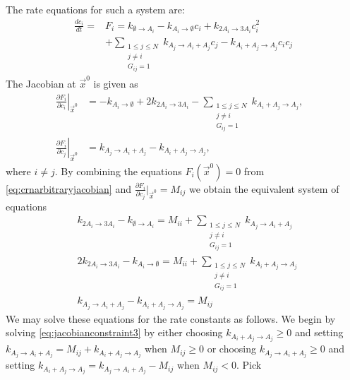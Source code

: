 The rate equations for such a system are:
\begin{equation}\label{eq:crnarbitraryjacobian}
\begin{aligned}
\frac{dc_i}{dt} = &F_i = k_{\emptyset \to A_i} - k_{A_i \to \emptyset} c_i + k_{2A_i \to 3A_i} c_i^2 \\
&+ \sum_{\substack{1 \le j \le N \\ j \neq i \\ G_{ij} = 1}} k_{A_j \to A_i + A_j} c_j - k_{A_i + A_j \to A_j} c_i c_j
\end{aligned}
\end{equation}
The Jacobian at $\vec{x}^0$ is given as
\begin{align*}
\left. \frac{\partial F_i}{\partial c_i}\right|_{\vec{x}^0} &= - k_{A_i \to \emptyset} + 2 k_{2A_i \to 3A_i} - \sum_{\substack{1 \le j \le N \\ j \neq i \\ G_{ij} = 1}} k_{A_i + A_j \rightarrow A_j}, & \\
\left. \frac{\partial F_i}{\partial c_j}\right|_{\vec{x}^0} &= k_{A_j \to A_i + A_j} - k_{A_i + A_j \to A_j}, &
\end{align*}
where $i \neq j$.
By combining the equations $F_i(\vec{x}^0) = 0$ from \ref{eq:crnarbitraryjacobian} and $\frac{\partial F_i}{\partial c_j}|_{\vec{x}^0} = M_{ij}$ we obtain the equivalent system of equations
\begin{align}
& k_{2A_i \to 3A_i} - k_{\emptyset \to A_i} = M_{ii} + \sum_{\substack{1 \le j \le N \\ j \neq i \\ G_{ij} = 1}} k_{A_j \to A_i + A_j} \label{eq:jacobianconstraint1}  \\
& 2k_{2A_i \to 3A_i} - k_{A_i \to \emptyset} = M_{ii} + \sum_{\substack{1 \le j \le N \\ j \neq i \\ G_{ij} = 1}} k_{A_i + A_j \to A_j} \label{eq:jacobianconstraint2}\\
& k_{A_j \to A_i + A_j} - k_{A_i + A_j \to A_j} = M_{ij} \label{eq:jacobianconstraint3}
\end{align}
We may solve these equations for the rate constants as follows.  We begin by solving \ref{eq:jacobianconstraint3} by either choosing $k_{A_i + A_j \to A_j} \ge 0$ and setting $k_{A_j \to A_i + A_j} = M_{ij} + k_{A_i + A_j \to A_j}$ when $M_{ij} \ge 0$ or choosing $k_{A_j \to A_i + A_j} \ge 0$ and setting $k_{A_i + A_j \to A_j} = k_{A_j \to A_i + A_j} - M_{ij}$ when $M_{ij} < 0$.  Pick
